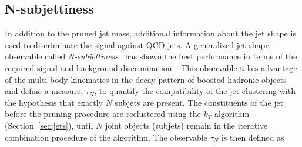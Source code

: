

\subsection{N-subjettiness}
\label{subsec:nsubj}

In addition to the pruned jet mass, additional information about the jet shape is used to discriminate the signal against QCD jets.
A generalized jet shape observable called \emph{N-subjettiness}~\cite{Thaler:2010tr} has shown the best performance in terms of the required signal and background discrimination~\cite{Khachatryan:2014vla}.
This observable takes advantage of the multi-body kinematics in the decay pattern of boosted hadronic objects and define a measure, $\tau_N$, to quantify the compatibility of the jet clustering with the hypothesis that exactly $N$ subjets are present.
The constituents of the jet before the pruning procedure are reclustered using the $k_T$ algorithm (Section~\ref{sec:jets}), until $N$ joint objects (subjets) remain in the iterative combination procedure of the algorithm. The observable $\tau_N$ is then defined as

